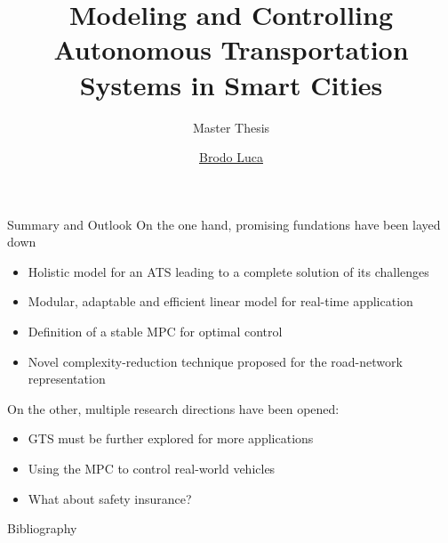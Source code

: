 \documentclass{beamer}
\title{Modeling and Controlling Autonomous Transportation Systems in Smart Cities}
\subtitle{Master Thesis}
\author{
\href{mailto:luca.brodo001@stud.fh-dortmund.de}{Brodo Luca}
}
\begin{document}
\maketitle
\pgfplotsset{compat = 1.3}









\begin{frame}{Summary and Outlook}	
	On the one hand, promising fundations have been layed down
	\vspace{0.15cm}
	\begin{itemize} 
		\item Holistic model for an ATS leading to a complete solution of its challenges
		\item Modular, adaptable and efficient linear model for real-time application
		\item Definition of a stable MPC for optimal control
		\item Novel complexity-reduction technique proposed for the road-network representation
	\end{itemize}
	\vspace{0.15cm}
	On the other, multiple research directions have been opened:
	\vspace{0.15cm}
	\begin{itemize} 
		\item GTS must be further explored for more applications
		\item Using the MPC to control real-world vehicles 
		\item What about safety insurance?
	\end{itemize}
	
\end{frame}

\bibbegin
\begin{frame}[allowframebreaks,label=references]{Bibliography}
    
     
\end{frame}
\bibend
\end{document}
